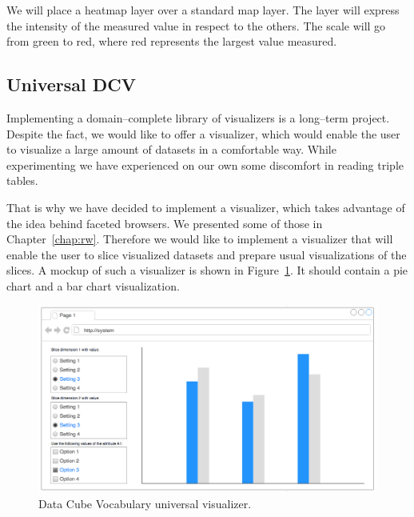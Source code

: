 We will place a heatmap layer over a standard map layer. The layer will express 
the intensity of the measured value in respect to the others. The scale will go from 
green to red, where red represents the largest value measured.

\subsection{Universal DCV}
Implementing a domain--complete library of visualizers is a long--term project. 
Despite the fact, we would like to offer a visualizer, which would enable the 
user to visualize a large amount of datasets in a comfortable way. While
experimenting we have experienced on our own some discomfort in reading triple tables.

That is why we have decided to implement a visualizer, which takes advantage of 
the idea behind faceted browsers. We presented some of those in 
Chapter~\ref{chap:rw}. Therefore we would like to implement a visualizer that will 
enable the user to slice visualized datasets and prepare usual visualizations of 
the slices. A mockup of such a visualizer is shown in 
Figure~\ref{fig:dcv-universal}. It should contain a pie chart and a bar chart 
visualization.

\begin{figure}
	\centering
	\includegraphics[width=140mm]{img/dcv-universal.png}
	\caption{Data Cube Vocabulary universal visualizer.}
	\label{fig:dcv-universal}
\end{figure}



